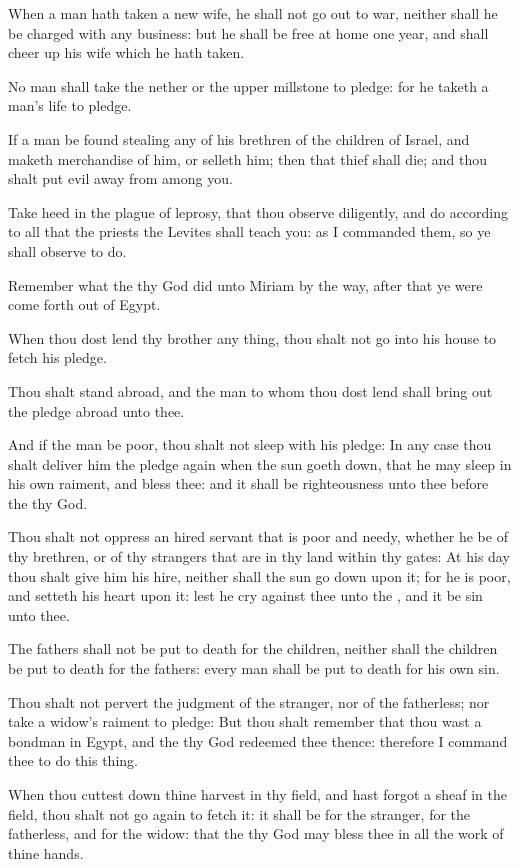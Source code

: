 \verse When a man hath taken a new wife, he shall not go out to war, neither shall he be charged with any business: but he shall be free at home one year, and shall cheer up his wife which he hath taken.

\verse No man shall take the nether or the upper millstone to pledge: for he taketh a man's life to pledge.

\verse If a man be found stealing any of his brethren of the children of Israel, and maketh merchandise of him, or selleth him; then that thief shall die; and thou shalt put evil away from among you.

\verse Take heed in the plague of leprosy, that thou observe diligently, and do according to all that the priests the Levites shall teach you: as I commanded them, so ye shall observe to do.

\verse Remember what the \LORD thy God did unto Miriam by the way, after that ye were come forth out of Egypt.

\verse When thou dost lend thy brother any thing, thou shalt not go into his house to fetch his pledge.

\verse Thou shalt stand abroad, and the man to whom thou dost lend shall bring out the pledge abroad unto thee.

\verse And if the man be poor, thou shalt not sleep with his pledge: \verse In any case thou shalt deliver him the pledge again when the sun goeth down, that he may sleep in his own raiment, and bless thee: and it shall be righteousness unto thee before the \LORD thy God.

\verse Thou shalt not oppress an hired servant that is poor and needy, whether he be of thy brethren, or of thy strangers that are in thy land within thy gates: \verse At his day thou shalt give him his hire, neither shall the sun go down upon it; for he is poor, and setteth his heart upon it: lest he cry against thee unto the \LORD, and it be sin unto thee.

\verse The fathers shall not be put to death for the children, neither shall the children be put to death for the fathers: every man shall be put to death for his own sin.

\verse Thou shalt not pervert the judgment of the stranger, nor of the fatherless; nor take a widow's raiment to pledge: \verse But thou shalt remember that thou wast a bondman in Egypt, and the \LORD thy God redeemed thee thence: therefore I command thee to do this thing.

\verse When thou cuttest down thine harvest in thy field, and hast forgot a sheaf in the field, thou shalt not go again to fetch it: it shall be for the stranger, for the fatherless, and for the widow: that the \LORD thy God may bless thee in all the work of thine hands.

